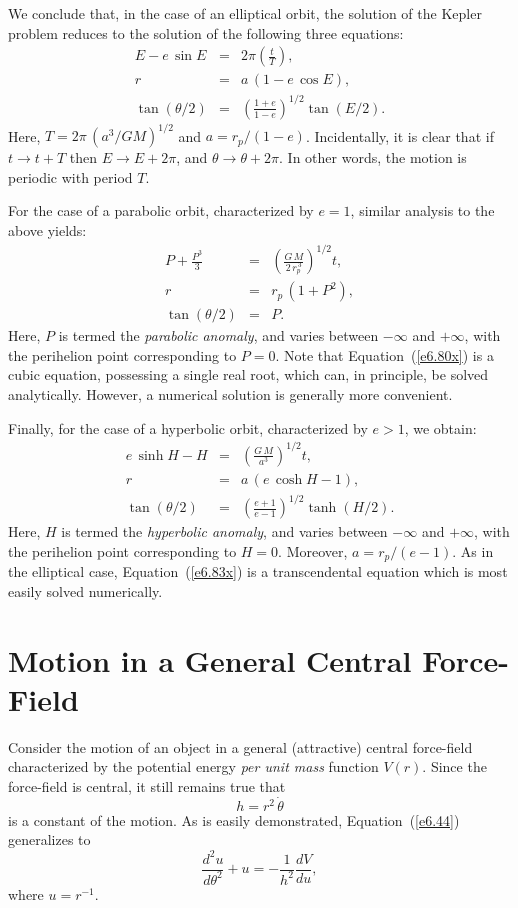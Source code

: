 We conclude that, in the case of an elliptical orbit, the solution of the Kepler problem reduces to the solution of the following three equations:
\begin{eqnarray}
E - e\,\sin E &=& 2\pi\left(\frac{t}{T}\right),\\[0.5ex]
r &=&a\,(1-e\,\cos E),\\[0.5ex]
\tan(\theta/2) &=&\left(\frac{1+e}{1-e}\right)^{1/2} \tan (E/2).
\end{eqnarray}
Here, $T=2\pi\,(a^3/GM)^{1/2}$ and $a=r_p/(1-e)$. Incidentally, it is clear that if $t\rightarrow t+T$ then $E\rightarrow E + 2\pi$, and $\theta\rightarrow
\theta+2\pi$. In other words, the motion is periodic with period
$T$. 

For the case of a parabolic orbit, characterized by $e=1$, similar analysis to
the above yields:
\begin{eqnarray}
P + \frac{P^3}{3} &=& \left(\frac{G\,M}{2\,r_p^{\,3}}\right)^{1/2} t,\label{e6.80x}\\[0.5ex]
r &=& r_p\,(1+P^2),\\[0.5ex]
\tan(\theta/2) &=& P.\label{e6.82x}
\end{eqnarray}
Here, $P$ is termed the {\em parabolic anomaly}, and varies between
$-\infty$ and $+\infty$, with the perihelion point corresponding to $P=0$. Note that Equation~(\ref{e6.80x}) is a cubic equation,
possessing a single real root,
which can, in principle, be solved analytically. However, a numerical
solution is generally more convenient.

Finally, for the case of a hyperbolic orbit, characterized by $e>1$,
we obtain:
\begin{eqnarray}
e\,\sinh H - H &=& \left(\frac{G\,M}{a^3}\right)^{1/2} t,\label{e6.83x}\\[0.5ex]
r &=& a\,(e\,\cosh H - 1),\\[0.5ex]
\tan(\theta/2) &=& \left(\frac{e+1}{e-1}\right)^{1/2} \tanh (H/2).\label{e6.85x}
\end{eqnarray}
Here, $H$ is termed the {\em hyperbolic anomaly}, and varies between
$-\infty$ and $+\infty$, with the perihelion point corresponding to $H=0$.  Moreover, $a=r_p/(e-1)$. As in the elliptical
case, Equation~(\ref{e6.83x}) is a transcendental equation which is most easily solved numerically.

\section{Motion in  a General Central Force-Field}
Consider the motion of an object in a general (attractive) central force-field characterized by the potential energy {\em per unit mass}\/ function $V(r)$. Since the force-field
is central, it still remains true that
\begin{equation}\label{6.63}
h = r^2\,\dot{\theta}
\end{equation}
is a constant of the motion. As is easily demonstrated, Equation~(\ref{e6.44})
generalizes to 
\begin{equation}\label{e6.64}
\frac{d^2 u}{d\theta^2} + u = - \frac{1}{h^2}\frac{dV}{du},
\end{equation}
where $u=r^{-1}$. 

